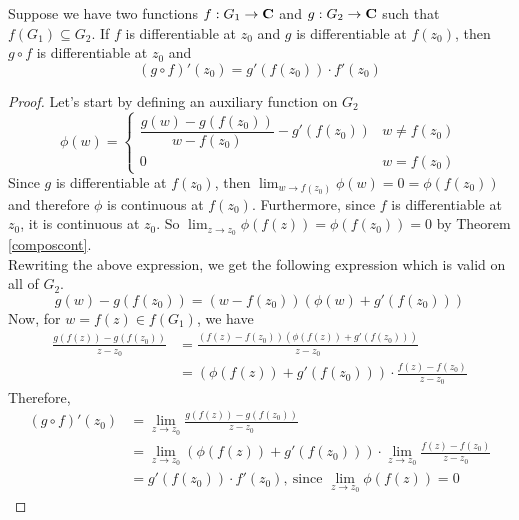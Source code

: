 \begin{proposition}
Suppose we have two functions $f:G_1 \to \mathbf C$ and $g: G_2 \to \mathbf C$ such that $f(G_1) \subseteq G_2$. If $f$ is differentiable at $z_0$ and $g$ is differentiable at $f(z_0)$, then $g\circ f$ is differentiable at $z_0$ and
\[(g\circ f)'(z_0) = g'(f(z_0))\cdot f'(z_0)\]
\end{proposition}
\begin{proof}
Let's start by defining an auxiliary function on $G_2$
\[\phi(w) = \begin{cases} \dfrac{g(w) - g(f(z_0))}{w - f(z_0)} - g'(f(z_0)) & w \neq f(z_0)\\[0.5em] 0 & w = f(z_0) \end{cases}\]
Since $g$ is differentiable at $f(z_0)$, then $\lim_{w \to f(z_0)}\phi(w) = 0 = \phi(f(z_0))$ and therefore $\phi$ is continuous at $f(z_0)$. Furthermore, since $f$ is differentiable at $z_0$, it is continuous at $z_0$. So $\lim_{z \to z_0}\phi(f(z)) = \phi(f(z_0)) = 0$ by Theorem \ref{composcont}.\\[1em]
Rewriting the above expression, we get the following expression which is valid on all of $G_2$.
\[g(w) - g(f(z_0)) = (w - f(z_0))(\phi(w) + g'(f(z_0)))\]
Now, for $w = f(z) \in f(G_1)$, we have
\begin{align*}
\frac{g(f(z)) - g(f(z_0))}{z - z_0} &= \frac{(f(z) - f(z_0))(\phi(f(z)) + g'(f(z_0)))}{z - z_0}\\[0.5em]
&= (\phi(f(z)) + g'(f(z_0)))\cdot\frac{f(z) - f(z_0)}{z - z_0}
\end{align*}
Therefore, 
\begin{align*}
(g\circ f)'(z_0) &= \lim_{z \to z_0}\frac{g(f(z)) - g(f(z_0))}{z - z_0}\\[0.5em]
&= \lim_{z \to z_0}(\phi(f(z)) + g'(f(z_0)))\cdot\lim_{z \to z_0}\frac{f(z) - f(z_0)}{z - z_0}\\[1em]
&= g'(f(z_0))\cdot f'(z_0),\ \text{since $\lim_{z \to z_0}\phi(f(z)) = 0$}
\end{align*}
\end{proof}

\bigskip


